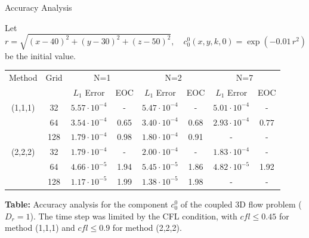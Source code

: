     \begin{frame}{Accuracy Analysis}
    	\scriptsize
    	
    	Let 
    	\[
    	r = \sqrt{(x-40)^2+(y-30)^2+(z-50)^2}, \quad
    	c^0_0(x, y, k, 0) = \exp(-0.01 \, r^2)
    	\] 
    	be the initial value.
    	
    	\medskip
    	\centering
    	\begin{tabular}{|c|c|c|c|c|c|c|c|}
    		\hline
    		Method & Grid & \multicolumn{2}{c|}{N=1} & \multicolumn{2}{c|}{N=2} & \multicolumn{2}{c|}{N=7} \\
    		\cline{3-8}
    		&  & $L_1$ Error & EOC & $L_1$ Error & EOC & $L_1$ Error & EOC \\
    		\hline
    		(1,1,1) & 32  & $5.57\cdot10^{-4}$ & -    & $5.47\cdot10^{-4}$ & -    & $5.01 \cdot10^{-4} $ & - \\
    		& 64  & $3.54\cdot10^{-4}$ & 0.65 & $3.40\cdot10^{-4}$ & 0.68 & $2.93\cdot10^{-4}$ & $0.77$ \\
    		& 128 & $1.79\cdot10^{-4}$ & 0.98 & $1.80\cdot10^{-4}$ & 0.91 & - & - \\
    		\hline
    		(2,2,2) & 32  & $1.79\cdot10^{-4}$ & -    & $2.00\cdot10^{-4}$ & -    & $1.83\cdot10^{-4}$ & - \\
    		& 64  & $4.66\cdot10^{-5}$ & 1.94 & $5.45\cdot10^{-5}$ & 1.86 & $4.82\cdot10^{-5}$ & 1.92 \\
    		& 128 & $1.17\cdot10^{-5}$ & 1.99 & $1.38\cdot10^{-5}$ & 1.98 & - & - \\
    		\hline
    	\end{tabular}
    	
    	\vspace{0.5em}
    	\footnotesize{
    		\textbf{Table:} Accuracy analysis for the component $c^0_0$ of the coupled 3D flow problem ($D_r=1$). The time step was limited by the CFL condition, with $cfl \le 0.45$ for method (1,1,1) and $cfl \le 0.9$ for method (2,2,2).  
    	}
    \end{frame}
    
    
    
